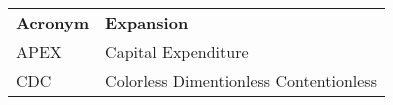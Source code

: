 \begin{table}[H]

\begin{tabular}{ l  l}
\textbf{Acronym} & \textbf{Expansion}  \\
APEX & Capital Expenditure \\
CDC & Colorless Dimentionless Contentionless\\
\end{tabular}

\end{table}